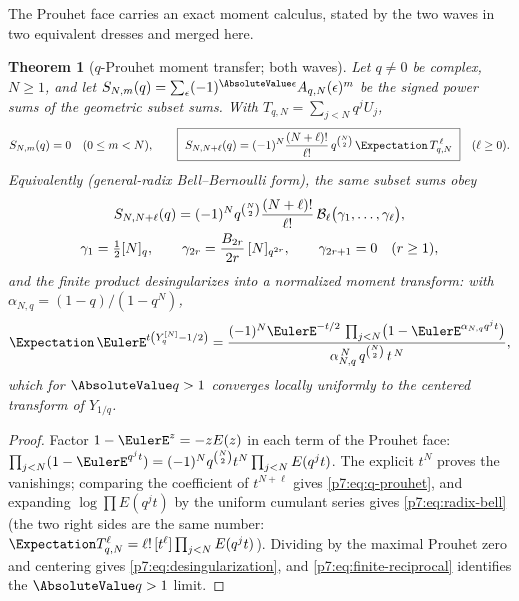\documentclass[11pt,oneside]{article}
\numberwithin{equation}{section}
\newtheorem{theorem}{Theorem}[section]
\theoremstyle{definition}
\theoremstyle{remark}
\newcommand{\Bell}{\mathcal B}
\begin{document}
The Prouhet face carries an exact moment calculus, stated by the two waves in
two equivalent dresses and merged here.

\begin{theorem}[$q$-Prouhet moment transfer; both waves]
\label{p7:thm:q-prouhet}
Let $q\ne0$ be complex, $N\ge1$, and let
$S_{N,m}(q)=\sum_{\epsilon}(-1)^{\AbsoluteValue\epsilon}A_{q,N}(\epsilon)^m$ be the
signed power sums of the geometric subset sums.  With
$T_{q,N}=\sum_{j<N}q^jU_j$,
\begin{equation}\label{p7:eq:q-prouhet}
 S_{N,m}(q)=0\quad(0\le m<N),
 \qquad
 \boxed{\ S_{N,N+\ell}(q)
 =(-1)^N\frac{(N+\ell)!}{\ell!}\,q^{\binom N2}\,
 \Expectation\,T_{q,N}^{\,\ell}\ }
 \quad(\ell\ge0).
\end{equation}
Equivalently (general-radix Bell--Bernoulli form), the same subset sums obey
\begin{gather}
 S_{N,N+\ell}(q)
 =(-1)^Nq^{\binom N2}\frac{(N+\ell)!}{\ell!}\,
 \Bell_\ell\bigl(\gamma_1,\ldots,\gamma_\ell\bigr),
 \label{p7:eq:radix-bell}\\
 \gamma_1=\tfrac12[N]_q,\qquad
 \gamma_{2r}=\frac{B_{2r}}{2r}\,[N]_{q^{2r}},\qquad
 \gamma_{2r+1}=0\quad(r\ge1),\notag
\end{gather}
and the finite product desingularizes into a normalized moment transform:
with $\alpha_{N,q}=(1-q)/(1-q^N)$,
\begin{equation}\label{p7:eq:desingularization}
 \Expectation\,\EulerE^{t\left(Y_q^{[N]}-1/2\right)}
 =\frac{(-1)^N\EulerE^{-t/2}\,
 \prod_{j<N}\bigl(1-\EulerE^{\alpha_{N,q}q^jt}\bigr)}
 {\alpha_{N,q}^{\,N}\,q^{\binom N2}\,t^{\,N}},
\end{equation}
which for $\AbsoluteValue q>1$ converges locally uniformly to the centered transform of
$Y_{1/q}$.
\end{theorem}

\begin{proof}
Factor $1-\EulerE^{z}=-zE(z)$ in each term of the Prouhet face:
$\prod_{j<N}(1-\EulerE^{q^jt})=(-1)^Nq^{\binom N2}t^N\prod_{j<N}E(q^jt)$.  The
explicit $t^N$ proves the vanishings; comparing the coefficient of
$t^{N+\ell}$ gives \eqref{p7:eq:q-prouhet}, and expanding
$\log\prod E(q^jt)$ by the uniform cumulant series gives
\eqref{p7:eq:radix-bell} (the two right sides are the same number:
$\Expectation T_{q,N}^{\ell}=\ell!\,[t^\ell]\prod_{j<N}E(q^jt)$).  Dividing by the
maximal Prouhet zero and centering gives \eqref{p7:eq:desingularization},
and \eqref{p7:eq:finite-reciprocal} identifies the $\AbsoluteValue q>1$ limit.
\end{proof}
\end{document}
